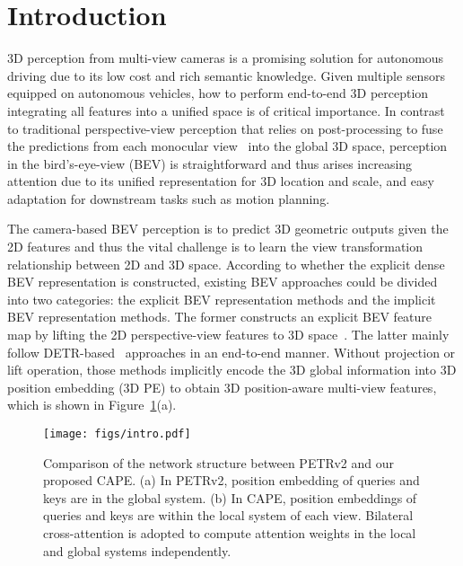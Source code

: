 \documentclass[10pt,twocolumn,letterpaper]{article}
\newcommand{\ourMethod}{CAPE}
\begin{document}
\section{Introduction}
\label{sec:intro}
3D perception from multi-view cameras is a promising solution for autonomous driving due to its low cost and rich semantic knowledge. Given multiple sensors equipped on autonomous vehicles, how to perform end-to-end 3D perception integrating all features into a unified space is of critical importance. In contrast to traditional perspective-view perception that relies on post-processing to fuse the predictions from each monocular view~\cite{wang2021fcos3d, wang2022probabilistic} into the global 3D space, perception in the bird's-eye-view (BEV) is straightforward and thus arises increasing attention due to its unified representation for 3D location and scale, and easy adaptation for downstream tasks such as motion planning.


The camera-based BEV perception is to predict 3D geometric outputs given the 2D features and thus the vital challenge is to learn the view transformation relationship between 2D and 3D space.
According to whether the explicit dense BEV representation is constructed, 
existing BEV approaches could be divided into two categories: the explicit BEV representation methods and the implicit BEV representation methods. 
The former constructs an explicit BEV feature map by lifting the 2D perspective-view features to 3D space~\cite{li2022bevformer,philion2020lift, huang2021bevdet}. The latter mainly follow DETR-based~\cite{carion2020end} approaches in an end-to-end manner. Without projection or lift operation, those methods \cite{zhou2022cross, liu2022petr,liu2022petrv2} implicitly encode the 3D global information into 3D position embedding (3D PE) to obtain 3D position-aware multi-view features, which is shown in Figure~\ref{fig:intro1}(a).

\begin{figure}[t]
\centering
\texttt{[image: figs/intro.pdf]}
\caption{
Comparison of the network structure between PETRv2 and our proposed \ourMethod{}. (a) In PETRv2, position embedding of queries and keys are in the global system. (b) In \ourMethod{}, position embeddings of queries and keys are within the local system of each view. Bilateral cross-attention is adopted to compute attention weights in the local and global systems independently.}
\centering
\label{fig:intro1}
\vspace{-10pt}
\end{figure}
\end{document}
